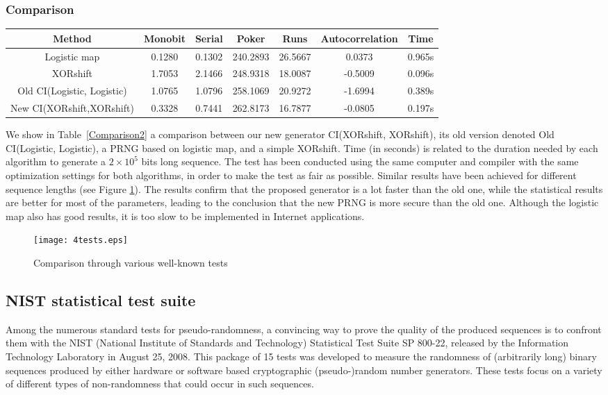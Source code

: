 \documentclass[10pt, a4paper, conference, compsocconf]{IEEEtran}
\begin{document}
\subsubsection{Comparison}
\begin{table*}[!t]
\renewcommand{\arraystretch}{1.3}
\caption{Comparison with Old CI(Logistic, Logistic) for a $2 \times 10^5$ bits sequence}
\label{Comparison2}
\centering
  \begin{tabular}{ccccccc}
    \hline
Method & Monobit & Serial & Poker & Runs & Autocorrelation & Time  \\ \hline
Logistic map &0.1280&0.1302&240.2893&26.5667&0.0373&0.965s \\
XORshift &1.7053&2.1466&248.9318&18.0087&-0.5009&0.096s \\
Old CI(Logistic, Logistic) &1.0765&1.0796&258.1069&20.9272&-1.6994&0.389s \\
New CI(XORshift,XORshift) &0.3328&0.7441&262.8173&16.7877&-0.0805&0.197s\\
    \hline
  \end{tabular}
\end{table*}
We show in Table~\ref{Comparison2} a comparison between our new generator CI(XORshift, XORshift), its old version denoted Old CI(Logistic, Logistic), a PRNG based on logistic map, and a simple XORshift. Time (in seconds) is related to the duration needed by each algorithm to generate a $2 \times 10^5$ bits long sequence. The test has been conducted using the same computer and compiler with the same optimization settings for both algorithms, in order to make the test as fair as possible. Similar results have been achieved for different sequence lengths (see Figure \ref{Comparison1}).
The results confirm that the proposed generator is a lot faster than the old one, while the statistical results are better for most of the parameters, leading to the conclusion that the new PRNG is more secure than the old one. Although the logistic map also has good results, it is too slow to be implemented in Internet applications.


\begin{figure}
\centering
\texttt{[image: 4tests.eps]}
\caption{Comparison through various well-known tests}
\label{Comparison1}
\end{figure}


\subsection{NIST statistical test suite}
Among the numerous standard tests for pseudo-randomness, a convincing way to prove the quality of the produced sequences is to confront them with the NIST (National Institute of  Standards and Technology) Statistical Test Suite SP 800-22, released by the Information Technology Laboratory in August 25, 2008. This package of 15 tests was developed to measure the randomness of (arbitrarily long) binary sequences produced by either hardware or software based cryptographic (pseudo-)random number generators. These tests focus on a variety of different types of non-randomness that could occur in such sequences.
\end{document}
